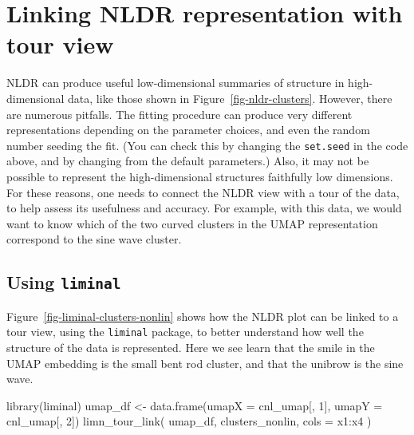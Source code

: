 \documentclass[
  letterpaper,
]{book}
\newenvironment{Shaded}{\begin{snugshade}}{\end{snugshade}}
\newcommand{\AttributeTok}[1]{\textcolor[rgb]{0.40,0.45,0.13}{#1}}
\newcommand{\DecValTok}[1]{\textcolor[rgb]{0.68,0.00,0.00}{#1}}
\newcommand{\FunctionTok}[1]{\textcolor[rgb]{0.28,0.35,0.67}{#1}}
\newcommand{\NormalTok}[1]{\textcolor[rgb]{0.00,0.23,0.31}{#1}}
\newcommand{\OtherTok}[1]{\textcolor[rgb]{0.00,0.23,0.31}{#1}}
\newcommand{\SpecialCharTok}[1]{\textcolor[rgb]{0.37,0.37,0.37}{#1}}
\begin{document}
\hypertarget{linking-nldr-representation-with-tour-view}{%
\section{Linking NLDR representation with tour
view}\label{linking-nldr-representation-with-tour-view}}

NLDR can produce useful low-dimensional summaries of structure in
high-dimensional data, like those shown in
Figure~\ref{fig-nldr-clusters}. However, there are numerous pitfalls.
The fitting procedure can produce very different representations
depending on the parameter choices, and even the random number seeding
the fit. (You can check this by changing the \texttt{set.seed} in the
code above, and by changing from the default parameters.) Also, it may
not be possible to represent the high-dimensional structures faithfully
low dimensions. For these reasons, one needs to connect the NLDR view
with a tour of the data, to help assess its usefulness and accuracy. For
example, with this data, we would want to know which of the two curved
clusters in the UMAP representation correspond to the sine wave cluster.

\hypertarget{using-liminal}{%
\subsection{\texorpdfstring{Using
\texttt{liminal}}{Using liminal}}\label{using-liminal}}

Figure~\ref{fig-liminal-clusters-nonlin} shows how the NLDR plot can be
linked to a tour view, using the \texttt{liminal} package, to better
understand how well the structure of the data is represented. Here we
see learn that the smile in the UMAP embedding is the small bent rod
cluster, and that the unibrow is the sine wave.

\begin{Shaded}
\begin{Highlighting}[]
\FunctionTok{library}\NormalTok{(liminal)}
\NormalTok{umap\_df }\OtherTok{\textless{}{-}} \FunctionTok{data.frame}\NormalTok{(}\AttributeTok{umapX =}\NormalTok{ cnl\_umap[, }\DecValTok{1}\NormalTok{],}
                      \AttributeTok{umapY =}\NormalTok{ cnl\_umap[, }\DecValTok{2}\NormalTok{])}
\FunctionTok{limn\_tour\_link}\NormalTok{(}
\NormalTok{  umap\_df,}
\NormalTok{  clusters\_nonlin,}
  \AttributeTok{cols =}\NormalTok{ x1}\SpecialCharTok{:}\NormalTok{x4}
\NormalTok{)}
\end{Highlighting}
\end{Shaded}
\end{document}

